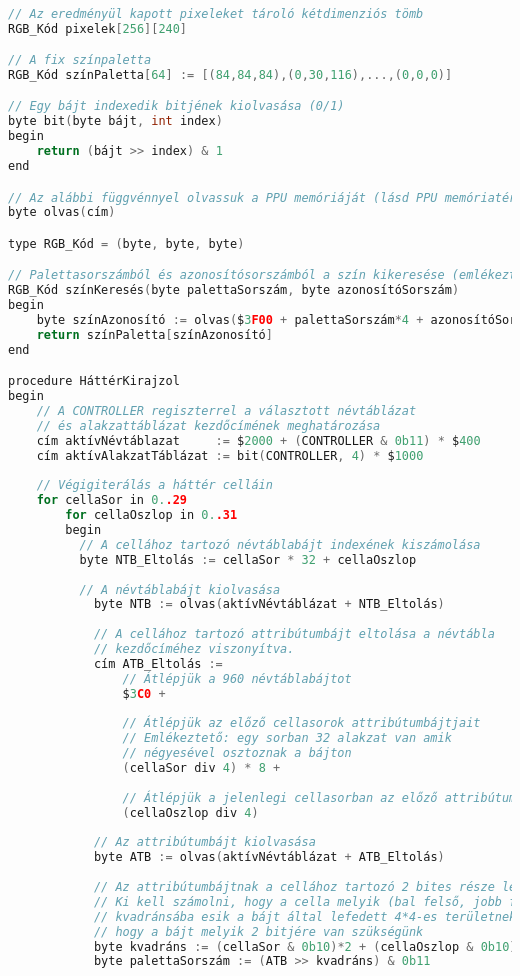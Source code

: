 \begin{lstlisting}[backgroundcolor = \color{white}, language=c, basicstyle=\scriptsize]

// Az eredményül kapott pixeleket tároló kétdimenziós tömb
RGB_Kód pixelek[256][240]

// A fix színpaletta
RGB_Kód színPaletta[64] := [(84,84,84),(0,30,116),...,(0,0,0)]

// Egy bájt indexedik bitjének kiolvasása (0/1)
byte bit(byte bájt, int index)
begin
	return (bájt >> index) & 1
end

// Az alábbi függvénnyel olvassuk a PPU memóriáját (lásd PPU memóriatérkép)
byte olvas(cím)

type RGB_Kód = (byte, byte, byte)

// Palettasorszámból és azonosítósorszámból a szín kikeresése (emlékeztető: $3F00 a paletta index kezdőcíme)
RGB_Kód színKeresés(byte palettaSorszám, byte azonosítóSorszám)
begin
	byte színAzonosító := olvas($3F00 + palettaSorszám*4 + azonosítóSorszám)
	return színPaletta[színAzonosító]
end

procedure HáttérKirajzol
begin
	// A CONTROLLER regiszterrel a választott névtáblázat
	// és alakzattáblázat kezdőcímének meghatározása
	cím aktívNévtáblazat     := $2000 + (CONTROLLER & 0b11) * $400
	cím aktívAlakzatTáblázat := bit(CONTROLLER, 4) * $1000
	
	// Végigiterálás a háttér celláin
	for cellaSor in 0..29
		for cellaOszlop in 0..31
		begin
		  // A cellához tartozó névtáblabájt indexének kiszámolása
		  byte NTB_Eltolás := cellaSor * 32 + cellaOszlop 
		  
		  // A névtáblabájt kiolvasása
			byte NTB := olvas(aktívNévtáblázat + NTB_Eltolás)
			
			// A cellához tartozó attribútumbájt eltolása a névtábla
			// kezdőcíméhez viszonyítva.
			cím ATB_Eltolás := 
				// Átlépjük a 960 névtáblabájtot 
				$3C0 +		
								
				// Átlépjük az előző cellasorok attribútumbájtjait
				// Emlékeztető: egy sorban 32 alakzat van amik 
				// négyesével osztoznak a bájton
				(cellaSor div 4) * 8 + 	
					
				// Átlépjük a jelenlegi cellasorban az előző attribútumbájtokat
				(cellaOszlop div 4)         
				
			// Az attribútumbájt kiolvasása
			byte ATB := olvas(aktívNévtáblázat + ATB_Eltolás)
			
			// Az attribútumbájtnak a cellához tartozó 2 bites része lesz a palettasorszám.
			// Ki kell számolni, hogy a cella melyik (bal felső, jobb felső, stb.)
			// kvadránsába esik a bájt által lefedett 4*4-es területnek, ugyanis így kapjuk meg,
			// hogy a bájt melyik 2 bitjére van szükségünk
			byte kvadráns := (cellaSor & 0b10)*2 + (cellaOszlop & 0b10) 
			byte palettaSorszám := (ATB >> kvadráns) & 0b11
				

\end{lstlisting}
